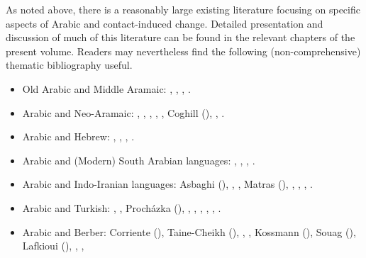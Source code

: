 \documentclass[output=paper]{langsci/langscibook}
\begin{document}
As noted above, there is a reasonably large existing literature focusing on specific aspects of Arabic and contact-induced change. Detailed presentation and discussion of much of this literature can be found in the relevant chapters of the present volume. Readers may nevertheless find the following (non-comprehensive) thematic bibliography useful.
\begin{itemize}[noitemsep,leftmargin=11pt]
\item[\adfhalfrightarrowhead]Old Arabic and Middle Aramaic: \citet{Fraenkel1886}, \citet{Stein2018}, \citet{Retsö2011}, \citet{Weninger2011Aramaic}.

\item[\adfhalfrightarrowhead]Arabic and Neo-Aramaic: \citet{Sabar1984},
\citet{ArnoldBehnstedt1993}, \citet{Khan2002}, \citet{Arnold2007}, \citet{Borg2008}, Coghill (\citeyear{Coghill2010,Coghill2012,Coghill2015}), \citet{Jastrow2015}, \citet{Owens2016Aramaic}.

\item[\adfhalfrightarrowhead]Arabic and Hebrew:
\citet{Blau1981}, \citet{Nevo1999}, \citet{Yoda2013}, \citet{Horesh2015}.

\item[\adfhalfrightarrowhead]Arabic and (Modern) South Arabian languages: \citet{Diem1979}, \citet{Lonnet2011}, \citet{Zammit2011}, \citet{Watson2018}.

\item[\adfhalfrightarrowhead]Arabic and Indo-Iranian languages: Asbaghi (\citeyear{Asbaghi1987,Asbaghi2011}), \citet{Tsabolov1994}, \citet{Ingham2005}, Matras (\citeyear{Matras2007Domari,Matras2012}), \citet{Gazsi2011}, \citet{Ṣādiqī2011}, \citet{WalAnonby2015}, \citet{Herin2018}.

\item[\adfhalfrightarrowhead]Arabic and Turkish: \citet{BenCheneb1922}, \citet{Reinkowski1995}, Procházka (\citeyear{Procházka2002Adana,Procházka2011Turkish}), \citet{Isaksson2005}, \citet{SánchezVicente2012}, \citet{Haig2014}, \citet{Taylan2017}, \citet{AkkusBenmamoun2018}, \citet{Procházka-Eisl2018}.

\item[\adfhalfrightarrowhead]Arabic and Berber: Corriente (\citeyear{Corriente1998Berber,Corriente2002}), Taine-Cheikh (\citeyear{Taine-Cheikh1997Zenaga,Taine-Cheikh2008chapter,Taine-Cheikh2012,Taine-Cheikh2018quadri}), \citet{Brahimi2000}, \citet{Ameur2008}, Kossmann
(\citeyear{Kossmann2009,Kossmann2010,Kossmann2013book,Kossmann2013chapter,Kossmann2014}), Souag (\citeyear{Souag2007,Souag2009,Souag2013book,Souag2018berber,Souag2018thing}), Lafkioui (\citeyear{Lafkioui2013reinventing,Lafkioui2013bu}), \citet{Tigziri2008}, \citet{ElAissati2011}, \citet{vanPuttenBenkato2017}


\end{itemize}
\end{document}
